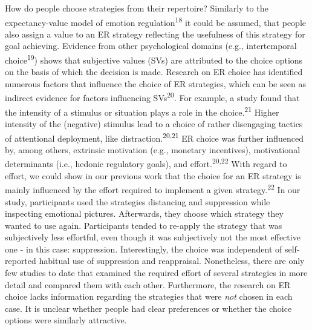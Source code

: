 \documentclass[
  english,
  man,floatsintext]{apa6}
\begin{document}
How do people choose strategies from their repertoire?
Similarly to the expectancy-value model of emotion regulation\textsuperscript{18} it could be assumed, that people also assign a value to an ER strategy reflecting the usefulness of this strategy for goal achieving.
Evidence from other psychological domains (e.g., intertemporal choice\textsuperscript{19}) shows that subjective values (SVs) are attributed to the choice options on the basis of which the decision is made.
Research on ER choice has identified numerous factors that influence the choice of ER strategies, which can be seen as indirect evidence for factors influencing SVs\textsuperscript{20}.
For example, a study found that the intensity of a stimulus or situation plays a role in the choice.\textsuperscript{21}
Higher intensity of the (negative) stimulus lead to a choice of rather disengaging tactics of attentional deployment, like distraction.\textsuperscript{20,21}
ER choice was further influenced by, among others, extrinsic motivation (e.g., monetary incentives), motivational determinants (i.e., hedonic regulatory goals), and effort.\textsuperscript{20,22}
With regard to effort, we could show in our previous work that the choice for an ER strategy is mainly influenced by the effort required to implement a given strategy.\textsuperscript{22}
In our study, participants used the strategies distancing and suppression while inspecting emotional pictures.
Afterwards, they choose which strategy they wanted to use again.
Participants tended to re-apply the strategy that was subjectively less effortful, even though it was subjectively not the most effective one - in this case: suppression.
Interestingly, the choice was independent of self-reported habitual use of suppression and reappraisal.
Nonetheless, there are only few studies to date that examined the required effort of several strategies in more detail and compared them with each other.
Furthermore, the research on ER choice lacks information regarding the strategies that were \emph{not} chosen in each case.
It is unclear whether people had clear preferences or whether the choice options were similarly attractive.
\end{document}
